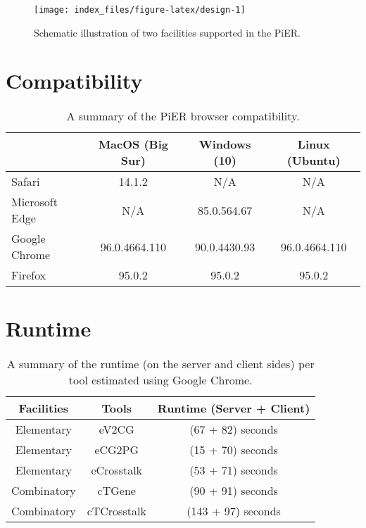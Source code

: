 \documentclass[
  oneside]{book}
\begin{document}
\begin{figure}

{\centering \texttt{[image: index\_files/figure-latex/design-1]} 

}

\caption{Schematic illustration of two facilities supported in the PiER.}\label{fig:design}
\end{figure}

\hypertarget{compatibility}{%
\chapter{Compatibility}\label{compatibility}}

\begin{table}

\caption{\label{tab:unnamed-chunk-3}A summary of the PiER browser compatibility.}
\centering
\begin{tabular}[t]{l|c|c|c}
\hline
  & MacOS (Big Sur) & Windows (10) & Linux (Ubuntu)\\
\hline
Safari & 14.1.2 & N/A & N/A\\
\hline
Microsoft Edge & N/A & 85.0.564.67 & N/A\\
\hline
Google Chrome & 96.0.4664.110 & 90.0.4430.93 & 96.0.4664.110\\
\hline
Firefox & 95.0.2 & 95.0.2 & 95.0.2\\
\hline
\end{tabular}
\end{table}

\hypertarget{runtime}{%
\chapter{Runtime}\label{runtime}}

\begin{table}

\caption{\label{tab:unnamed-chunk-4}A summary of the runtime (on the server and client sides) per tool estimated using Google Chrome.}
\centering
\begin{tabular}[t]{c|c|c}
\hline
Facilities & Tools & Runtime (Server + Client)\\
\hline
Elementary & eV2CG & (67 + 82) seconds\\
\hline
Elementary & eCG2PG & (15 + 70) seconds\\
\hline
Elementary & eCrosstalk & (53 + 71) seconds\\
\hline
Combinatory & cTGene & (90 + 91) seconds\\
\hline
Combinatory & cTCrosstalk & (143 + 97) seconds\\
\hline
\end{tabular}
\end{table}
\end{document}
